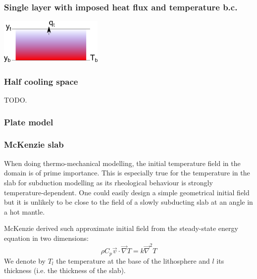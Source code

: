 

 
\subsubsection{Single layer with imposed heat flux and temperature b.c. }

\begin{center}
\includegraphics[width=5cm]{images/initial_temperature/tempcond3.png}
\end{center}



\subsubsection{Half cooling space}

TODO. 

\Literature \cite{fagm12} 

\subsubsection{Plate model}

\subsubsection{McKenzie slab}

When doing thermo-mechanical modelling, the initial temperature
field in the domain is of prime importance. This is 
especially true for the temperature in the slab for subduction 
modelling as its rheological behaviour is strongly temperature-dependent. 
One could easily design a simple geometrical initial field but it is 
unlikely to be close to the field of a slowly subducting slab at an angle 
in a hot mantle. 

McKenzie \cite{mcke69} derived such approximate initial field from the 
steady-state energy equation in two dimensions:
\begin{equation}
\rho C_p \vec v \cdot \vec\nabla T = k \vec\nabla^2 T
\end{equation}
We denote by $T_l$ the temperature at the base of the lithosphere
and $l$ its thickness (i.e. the thickness of the slab).

